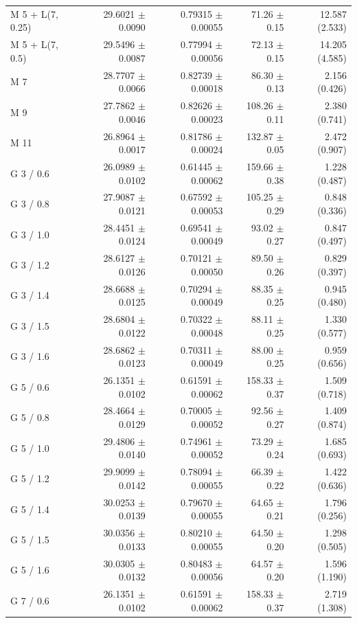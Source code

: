 \begin{longtable}{lrrrr}
M 5 + L(7, 0.25) & 29.6021 $\pm$ 0.0090 & 0.79315 $\pm$ 0.00055 & 71.26 $\pm$ 0.15 & 12.587 (2.533) \\
M 5 + L(7, 0.5) & 29.5496 $\pm$ 0.0087 & 0.77994 $\pm$ 0.00056 & 72.13 $\pm$ 0.15 & 14.205 (4.585) \\
M 7 & 28.7707 $\pm$ 0.0066 & 0.82739 $\pm$ 0.00018 & 86.30 $\pm$ 0.13 & 2.156 (0.426) \\
M 9 & 27.7862 $\pm$ 0.0046 & 0.82626 $\pm$ 0.00023 & 108.26 $\pm$ 0.11 & 2.380 (0.741) \\
M 11 & 26.8964 $\pm$ 0.0017 & 0.81786 $\pm$ 0.00024 & 132.87 $\pm$ 0.05 & 2.472 (0.907) \\
G 3 / 0.6 & 26.0989 $\pm$ 0.0102 & 0.61445 $\pm$ 0.00062 & 159.66 $\pm$ 0.38 & 1.228 (0.487) \\
G 3 / 0.8 & 27.9087 $\pm$ 0.0121 & 0.67592 $\pm$ 0.00053 & 105.25 $\pm$ 0.29 & 0.848 (0.336) \\
G 3 / 1.0 & 28.4451 $\pm$ 0.0124 & 0.69541 $\pm$ 0.00049 & 93.02 $\pm$ 0.27 & 0.847 (0.497) \\
G 3 / 1.2 & 28.6127 $\pm$ 0.0126 & 0.70121 $\pm$ 0.00050 & 89.50 $\pm$ 0.26 & 0.829 (0.397) \\
G 3 / 1.4 & 28.6688 $\pm$ 0.0125 & 0.70294 $\pm$ 0.00049 & 88.35 $\pm$ 0.25 & 0.945 (0.480) \\
G 3 / 1.5 & 28.6804 $\pm$ 0.0122 & 0.70322 $\pm$ 0.00048 & 88.11 $\pm$ 0.25 & 1.330 (0.577) \\
G 3 / 1.6 & 28.6862 $\pm$ 0.0123 & 0.70311 $\pm$ 0.00049 & 88.00 $\pm$ 0.25 & 0.959 (0.656) \\
G 5 / 0.6 & 26.1351 $\pm$ 0.0102 & 0.61591 $\pm$ 0.00062 & 158.33 $\pm$ 0.37 & 1.509 (0.718) \\
G 5 / 0.8 & 28.4664 $\pm$ 0.0129 & 0.70005 $\pm$ 0.00052 & 92.56 $\pm$ 0.27 & 1.409 (0.874) \\
G 5 / 1.0 & 29.4806 $\pm$ 0.0140 & 0.74961 $\pm$ 0.00052 & 73.29 $\pm$ 0.24 & 1.685 (0.693) \\
G 5 / 1.2 & 29.9099 $\pm$ 0.0142 & 0.78094 $\pm$ 0.00055 & 66.39 $\pm$ 0.22 & 1.422 (0.636) \\
G 5 / 1.4 & 30.0253 $\pm$ 0.0139 & 0.79670 $\pm$ 0.00055 & 64.65 $\pm$ 0.21 & 1.796 (0.256) \\
G 5 / 1.5 & 30.0356 $\pm$ 0.0133 & 0.80210 $\pm$ 0.00055 & 64.50 $\pm$ 0.20 & 1.298 (0.505) \\
G 5 / 1.6 & 30.0305 $\pm$ 0.0132 & 0.80483 $\pm$ 0.00056 & 64.57 $\pm$ 0.20 & 1.596 (1.190) \\
G 7 / 0.6 & 26.1351 $\pm$ 0.0102 & 0.61591 $\pm$ 0.00062 & 158.33 $\pm$ 0.37 & 2.719 (1.308) \\

\end{longtable}
